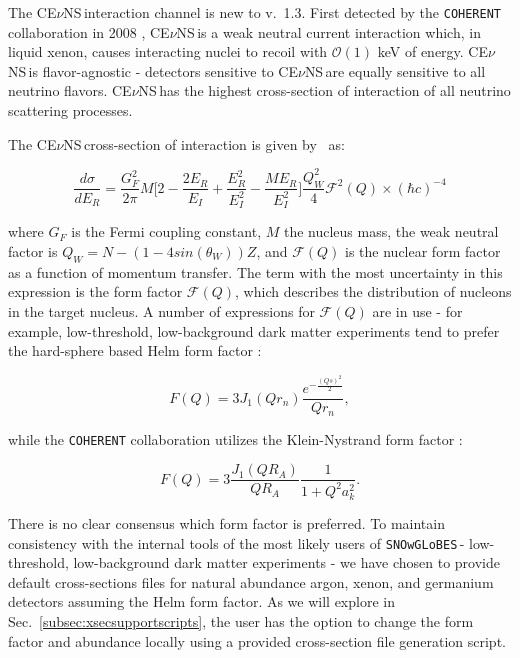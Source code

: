 \documentclass{article}
\newcommand{\cev}{CE$\nu$NS\,}
\newcommand{\snow}{\texttt{SNOwGLoBES}\,}
\begin{document}
The \cev interaction channel is new to v.~1.3. First detected by the \texttt{COHERENT} collaboration in 2008 \cite{AGUILARAREVALO200841}, \cev is a weak neutral current interaction which, in liquid xenon, causes interacting nuclei to recoil with $\mathcal{O}(1)$ keV of energy. \cev is flavor-agnostic - detectors sensitive to \cev are equally sensitive to all neutrino flavors. \cev has the highest cross-section of interaction of all neutrino scattering processes.

The \cev cross-section of interaction is given by~\cite{patton_neutrino-nucleus_2012} as:

\begin{equation} \label{eq:dsigma}
    \frac{d\sigma}{dE_R} = \frac{G_F^2}{2 \pi} M \bigg[ 2 - \frac{2E_R}{E_I} + \frac{E_R^2}{E_I^2} - \frac{M E_R}{E_I^2} \bigg] \frac{Q_W^2}{4} \mathcal{F}^2(Q) \times (\hbar c)^{-4}
\end{equation}

\noindent where $G_F$ is the Fermi coupling constant, $M$ the nucleus mass, the weak neutral factor is $Q_W = N - (1-4sin(\theta_W))Z$, and $\mathcal{F}(Q)$ is the nuclear form factor as a function of momentum transfer. The term with the most uncertainty in this expression is the form factor $\mathcal{F}(Q)$, which describes the distribution of nucleons in the target nucleus. A number of expressions for $\mathcal{F}(Q)$ are in use - for example, low-threshold, low-background dark matter experiments tend to prefer the hard-sphere based Helm form factor \cite{lewin_review_1996, akerib_lux-zeplin_2020}:

\begin{equation}
    F(Q) = 3 J_1(Q r_n) \frac{e^{-\frac{(Qs)^2}{2}}}{Q r_n},
    \label{eqn:helmform}
\end{equation}

\noindent while the \texttt{COHERENT} collaboration utilizes the Klein-Nystrand form factor \cite{klein_exclusive_1999}:

\begin{equation}
    F(Q) = 3 \frac{J_1(Q R_A)}{Q R_A} \frac{1}{1+Q^2 a_k^2}.
    \label{eqn:knform}
\end{equation}

\noindent There is no clear consensus which form factor is preferred. To maintain consistency with the internal tools of the most likely users of \snow - low-threshold, low-background dark matter experiments - we have chosen to provide default cross-sections files for natural abundance argon, xenon, and germanium detectors assuming the Helm form factor. As we will explore in Sec.~\ref{subsec:xsecsupportscripts}, the user has the option to change the form factor and abundance locally using a provided cross-section file generation script.
\end{document}
